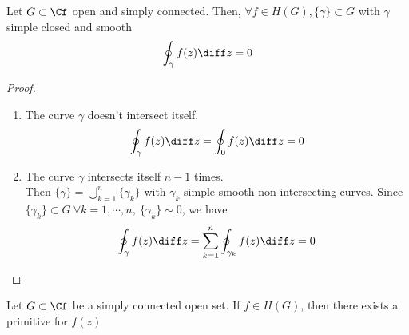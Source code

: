 \documentclass[../mmf.tex]{subfiles}
\begin{document}
\begin{thm}
	Let $G\subset\Cf$ open and simply connected. Then, $\forall f\in H(G), \{\gamma\}\subset G$ with $\gamma$ simple closed and smooth
	\begin{equation*}
		\oint_{\gamma}f(z)\diff z=0
	\end{equation*}
\end{thm}
\begin{proof}
	\begin{enumerate}
	\item The curve $\gamma$ doesn't intersect itself.
		\begin{equation*}
			\oint_\gamma f(z)\diff z=\oint_0 f(z)\diff z=0
		\end{equation*}
	\item The curve $\gamma$ intersects itself $n-1$ times.\\
		Then $\{\gamma\}=\bigcup_{k=1}^n\{\gamma_k\}$ with $\gamma_k$ simple smooth non intersecting curves. Since $\{\gamma_k\}\subset G\ \forall k=1,\cdots,n,\ \{\gamma_k\}\sim0$, we have
		\begin{equation*}
			\oint_\gamma f(z)\diff z=\sum_{k=1}^n\oint_{\gamma_k}f(z)\diff z=0
		\end{equation*}
	\end{enumerate}
\end{proof}
\begin{thm}
	Let $G\subset\Cf$ be a simply connected open set. If $f\in H(G)$, then there exists a primitive for $f(z)$
\end{thm}
\end{document}
